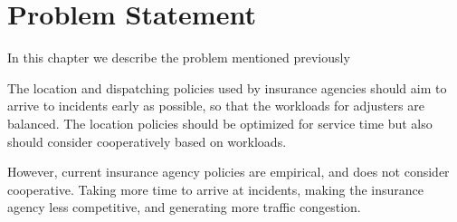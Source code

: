 \chapter{Problem Statement}
In this chapter we describe the problem
mentioned previously

The location and dispatching policies
used by insurance agencies
should aim
to arrive to incidents
early as possible,
so that
the workloads for adjusters are balanced.
The location policies
should be optimized for service time
but also should consider
cooperatively
based on workloads.

However,
current insurance agency policies
are empirical,
and does not consider cooperative.
Taking more time to arrive at incidents,
making the insurance agency
less competitive,
and generating more traffic congestion.

